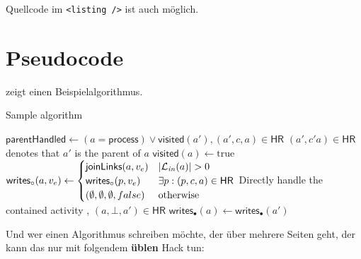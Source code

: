 

Quellcode im \lstinline|<listing />| ist auch möglich.


\section{Pseudocode}
 zeigt einen Beispielalgorithmus.
\begin{Algorithmus} %
  \caption{Sample algorithm}
  \label{alg:sample}
  \begin{algorithmic}
      \State $\mathsf{parentHandled} \gets (a = \mathsf{process}) \lor \mathsf{visited}(a'), (a',c,a) \in \mathsf{HR}$
      \State \Comment $(a',c'a) \in \mathsf{HR}$ denotes that $a'$ is the parent of $a$
      \State $\mathsf{visited}(a) \gets \text{true}$
      \State $\mathsf{writes}_\circ(a,v_e) \gets
        \begin{cases}
          \mathsf{joinLinks}(a,v_e)                & \left\lvert\mathcal{L}_\mathit{in}(a)\right\rvert > 0 \\
          \mathsf{writes}_\circ(p,v_e)
                                                   & \exists p: (p,c,a) \in \mathsf{HR}   \\
          (\emptyset, \emptyset, \emptyset, false) & \text{otherwise}
        \end{cases}
      $
      \State {}
      \State {}
     \Comment Directly handle the contained activity
      \State {}, $(a,\bot,a') \in \mathsf{HR}$
      \State $\mathsf{writes}_\bullet(a) \gets \mathsf{writes}_\bullet(a')$
    \EndIf
      \State {}
    \EndFor
    \EndIf
    \EndProcedure
  \end{algorithmic}
\end{Algorithmus}

\clearpage
Und wer einen Algorithmus schreiben möchte, der über mehrere Seiten geht, der kann das nur mit folgendem \textbf{üblen} Hack tun:

